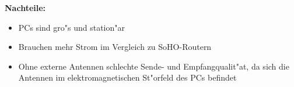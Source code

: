 \textbf{Nachteile: }

\begin{itemize}
\item PCs sind gro"s und station"ar
\item Brauchen mehr Strom im Vergleich zu SoHO-Routern
\item Ohne externe Antennen schlechte Sende- und Empfangqualit"at,
da sich die Antennen im elektromagnetischen St"orfeld des PCs befindet
\end{itemize}




